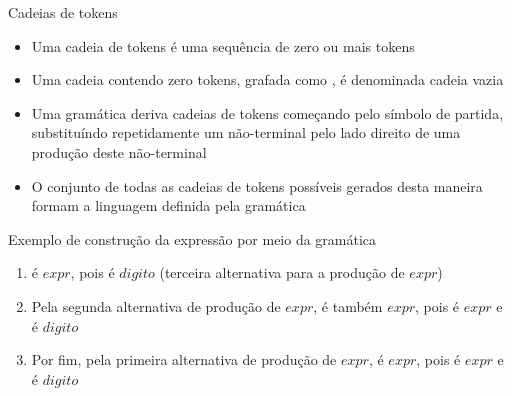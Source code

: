 \begin{frame}[fragile]{Cadeias de tokens}

    \begin{itemize}
        \item Uma cadeia de tokens é uma sequência de zero ou mais tokens

        \item Uma cadeia contendo zero tokens, grafada como , é denominada cadeia vazia

        \item Uma gramática deriva cadeias de tokens começando pelo símbolo de partida, substituíndo repetidamente um não-terminal pelo lado direito de uma
            produção deste não-terminal

        \item O conjunto de todas as cadeias de tokens possíveis gerados desta maneira formam a linguagem definida pela gramática
    \end{itemize}

\end{frame}

\begin{frame}[fragile]{Exemplo de construção da expressão  por meio da gramática}

    \begin{enumerate}
        \item {} é $expr$, pois  é $digito$ (terceira alternativa para a produção de $expr$)

        \item Pela segunda alternativa de produção de $expr$,   é também $expr$, pois  é $expr$ e  é $digito$

        \item Por fim, pela primeira alternativa de produção de $expr$,  é $expr$, pois  é $expr$ e  é $digito$
    \end{enumerate}

\end{frame}

